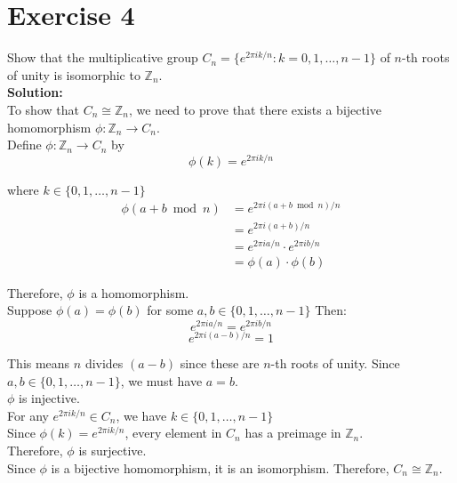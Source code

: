 \documentclass{article}
\begin{document}
\newpage

\section*{Exercise 4}
Show that the multiplicative group $C_n = \{e^{2\pi i k/n} : k = 0,1,\ldots,n-1\}$ of $n$-th roots of unity is isomorphic to $\mathbb{Z}_n$. \\

\textbf{Solution:} \\

To show that $C_n \cong \mathbb{Z}_n$, we need to prove that there exists a bijective homomorphism $\phi: \mathbb{Z}_n \to C_n$. \\

Define $\phi: \mathbb{Z}_n \to C_n$ by
\[\phi(k) = e^{2\pi i k/n}\]

where $k \in \{0,1,\ldots,n-1\}$ \\

\begin{align*}
\phi(a + b \bmod n) &= e^{2\pi i(a + b \bmod n)/n} \\
&= e^{2\pi i(a + b)/n} \\
&= e^{2\pi ia/n} \cdot e^{2\pi ib/n} \\
&= \phi(a) \cdot \phi(b)
\end{align*}

Therefore, $\phi$ is a homomorphism. \\

Suppose $\phi(a) = \phi(b)$ for some $a,b \in \{0,1,\ldots,n-1\}$
Then:
\[e^{2\pi ia/n} = e^{2\pi ib/n}\]
\[e^{2\pi i(a-b)/n} = 1\]

This means $n$ divides $(a-b)$ since these are $n$-th roots of unity.
Since $a,b \in \{0,1,\ldots,n-1\}$, we must have $a = b$. \\

$\phi$ is injective. \\

For any $e^{2\pi ik/n} \in C_n$, we have $k \in \{0,1,\ldots,n-1\}$ \\

Since $\phi(k) = e^{2\pi ik/n}$, every element in $C_n$ has a preimage in $\mathbb{Z}_n$. \\

Therefore, $\phi$ is surjective. \\

Since $\phi$ is a bijective homomorphism, it is an isomorphism. Therefore, $C_n \cong \mathbb{Z}_n$.
\newpage
\end{document}
